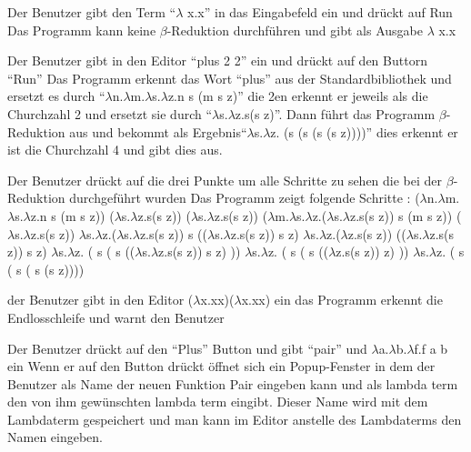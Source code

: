 \documentclass[parskip=full,11pt,twoside]{scrartcl}
\begin{document}
{Der Benutzer gibt den Term \enquote {$\lambda$ x.x} in das Eingabefeld ein und drückt auf Run}
{Das Programm kann keine $\beta$-Reduktion durchführen und gibt als Ausgabe $\lambda$ x.x}

{Der Benutzer gibt in den Editor \enquote {plus 2 2} ein und drückt auf den Buttorn \enquote {Run}}
{ Das Programm erkennt das Wort \enquote {plus} aus der Standardbibliothek und ersetzt es durch \enquote {$\lambda$n.$\lambda$m.$\lambda$s.$\lambda$z.n s (m s z)} die 2en erkennt er jeweils als die Churchzahl 2 und ersetzt sie durch \enquote {$\lambda$s.$\lambda$z.s(s z)}. Dann führt das Programm $\beta$-Reduktion aus und bekommt als Ergebnis\enquote {$\lambda$s.$\lambda$z. (s (s (s (s z))))} dies erkennt er ist die Churchzahl 4 und gibt dies aus. }

{ Der Benutzer drückt auf die drei Punkte um alle Schritte zu sehen die bei der $\beta$-Reduktion durchgeführt wurden }
{ Das Programm zeigt folgende Schritte :
\newline ($\lambda$n.$\lambda$m.$\lambda$s.$\lambda$z.n s (m s z)) ($\lambda$s.$\lambda$z.s(s z)) ($\lambda$s.$\lambda$z.s(s z))
\newline ($\lambda$m.$\lambda$s.$\lambda$z.($\lambda$s.$\lambda$z.s(s z)) s (m s z)) ($\lambda$s.$\lambda$z.s(s z))
\newline $\lambda$s.$\lambda$z.($\lambda$s.$\lambda$z.s(s z)) s (($\lambda$s.$\lambda$z.s(s z)) s z)
\newline $\lambda$s.$\lambda$z.($\lambda$z.s(s z)) (($\lambda$s.$\lambda$z.s(s z)) s z)
\newline $\lambda$s.$\lambda$z. ( s ( s (($\lambda$s.$\lambda$z.s(s z)) s z) ))
\newline $\lambda$s.$\lambda$z. ( s ( s (($\lambda$z.s(s z)) z) ))
\newline $\lambda$s.$\lambda$z. ( s ( s ( s (s z))))
 }

{der Benutzer gibt in den Editor ($\lambda$x.xx)($\lambda$x.xx) ein }
{ das Programm erkennt die Endlosschleife und warnt den Benutzer }

{ Der Benutzer drückt auf den \enquote {Plus} Button und gibt \enquote {pair} und $\lambda$a.$\lambda$b.$\lambda$f.f a b ein }
{Wenn er auf den Button drückt öffnet sich ein Popup-Fenster in dem der Benutzer als Name der neuen Funktion Pair eingeben kann und als lambda term den von ihm gewünschten lambda term eingibt. Dieser Name wird mit dem Lambdaterm gespeichert und man kann im Editor anstelle des Lambdaterms den Namen eingeben. }
\end{document}
